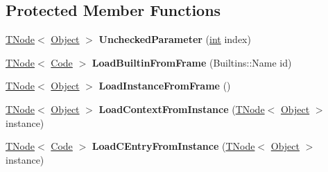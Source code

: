\subsection*{Protected Member Functions}
\begin{DoxyCompactItemize}
\item 
\mbox{\label{classv8_1_1internal_1_1WasmBuiltinsAssembler_aa060e7f814a3fe0eb6d23eb44c408b51}} 
\mbox{\hyperlink{classv8_1_1internal_1_1compiler_1_1TNode}{T\+Node}}$<$ \mbox{\hyperlink{classv8_1_1internal_1_1Object}{Object}} $>$ {\bfseries Unchecked\+Parameter} (\mbox{\hyperlink{classint}{int}} index)
\item 
\mbox{\label{classv8_1_1internal_1_1WasmBuiltinsAssembler_a4eb93988fa16d990c403231e6fac33ec}} 
\mbox{\hyperlink{classv8_1_1internal_1_1compiler_1_1TNode}{T\+Node}}$<$ \mbox{\hyperlink{classv8_1_1internal_1_1Code}{Code}} $>$ {\bfseries Load\+Builtin\+From\+Frame} (Builtins\+::\+Name id)
\item 
\mbox{\label{classv8_1_1internal_1_1WasmBuiltinsAssembler_a2ce4f2e0dc770e4dedfc93c3533bf1b8}} 
\mbox{\hyperlink{classv8_1_1internal_1_1compiler_1_1TNode}{T\+Node}}$<$ \mbox{\hyperlink{classv8_1_1internal_1_1Object}{Object}} $>$ {\bfseries Load\+Instance\+From\+Frame} ()
\item 
\mbox{\label{classv8_1_1internal_1_1WasmBuiltinsAssembler_a3350ae656e400e336cfd9223238e8cb4}} 
\mbox{\hyperlink{classv8_1_1internal_1_1compiler_1_1TNode}{T\+Node}}$<$ \mbox{\hyperlink{classv8_1_1internal_1_1Object}{Object}} $>$ {\bfseries Load\+Context\+From\+Instance} (\mbox{\hyperlink{classv8_1_1internal_1_1compiler_1_1TNode}{T\+Node}}$<$ \mbox{\hyperlink{classv8_1_1internal_1_1Object}{Object}} $>$ instance)
\item 
\mbox{\label{classv8_1_1internal_1_1WasmBuiltinsAssembler_a1eb1a7997658e0d70eb9d607ca3d4fc8}} 
\mbox{\hyperlink{classv8_1_1internal_1_1compiler_1_1TNode}{T\+Node}}$<$ \mbox{\hyperlink{classv8_1_1internal_1_1Code}{Code}} $>$ {\bfseries Load\+C\+Entry\+From\+Instance} (\mbox{\hyperlink{classv8_1_1internal_1_1compiler_1_1TNode}{T\+Node}}$<$ \mbox{\hyperlink{classv8_1_1internal_1_1Object}{Object}} $>$ instance)
\end{DoxyCompactItemize}
